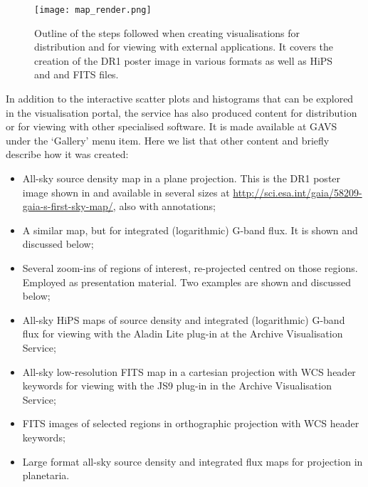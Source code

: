 \documentclass[longauth, final]{aa}
\begin{document}
\begin{figure*}[!htbp]
\centering
    \texttt{[image: map\_render.png]}
  \caption{Outline of the steps followed when  creating visualisations for distribution and for viewing with external applications. It covers the creation of the DR1 poster image in various formats as well as HiPS and and FITS files.}\label{fig:map_pipe}
\end{figure*}

In addition to the interactive scatter plots and histograms that can be explored in the visualisation portal, the service has also produced content  for distribution or for viewing with other specialised software. It is made available at GAVS under the `Gallery' menu item. Here we list that other content and briefly describe how it was created:
\begin{itemize}
\item All-sky source density map in a plane projection. This is the DR1 poster image shown in \cite{2016A&A...595A...2G} and available in several sizes at \url{http://sci.esa.int/gaia/58209-gaia-s-first-sky-map/}, also with annotations;
\item A similar map, but for integrated (logarithmic) G-band flux. It is shown and discussed below;
\item Several zoom-ins of regions of interest, re-projected centred on those regions. Employed as presentation material. Two examples are shown and discussed below;
\item All-sky HiPS maps of source density and integrated (logarithmic) G-band flux for viewing with the Aladin Lite plug-in  at the Archive Visualisation Service;
\item All-sky  low-resolution FITS map in a cartesian projection with WCS header keywords for viewing with the JS9 plug-in in the Archive Visualisation Service;
\item FITS images of selected regions in orthographic projection with WCS header keywords;
\item Large format all-sky source density and integrated flux maps for projection in planetaria.
\end{itemize}
\end{document}
